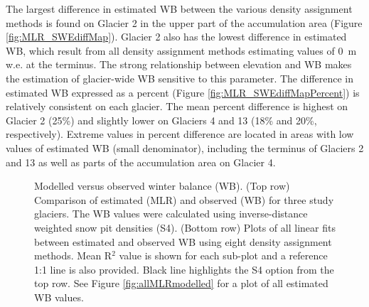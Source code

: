 \documentclass{sfuthesis}
\begin{document}
The largest difference in estimated WB between the various density assignment methods is found on Glacier 2 in the upper part of the accumulation area (Figure \ref{fig:MLR_SWEdiffMap}). Glacier 2 also has the lowest difference in estimated WB, which result from all density assignment methods estimating values of 0 \,m\,w.e. at the terminus. The strong relationship between elevation and WB makes the estimation of glacier-wide WB sensitive to this parameter. The difference in estimated WB expressed as a percent (Figure \ref{fig:MLR_SWEdiffMapPercent}) is relatively consistent on each glacier. The mean percent difference is highest on Glacier 2 (25\%) and slightly lower on Glaciers 4 and 13 (18\% and 20\%, respectively). Extreme values in percent difference are located in areas with low values of estimated WB (small denominator), including the terminus of Glaciers 2 and 13 as well as parts of the accumulation area on Glacier 4.  



\begin{figure}
    \centering
    \begin{subfigure}[b]{\textwidth}
    \end{subfigure}
    
    \begin{subfigure}[b]{\textwidth}
    \end{subfigure}

    \caption{Modelled versus observed winter balance (WB). (Top row) Comparison of estimated (MLR) and observed (WB) for three study glaciers. The WB values were calculated using inverse-distance weighted snow pit densities (S4). (Bottom row) Plots of all linear fits between estimated and observed WB using eight density assignment methods. Mean R$^2$ value is shown for each sub-plot and a reference 1:1 line is also provided. Black line highlights the S4 option from the top row. See Figure \ref{fig:allMLRmodelled} for a plot of all estimated WB values.}
    \label{fig:MLRfit}
\end{figure}
\end{document}
